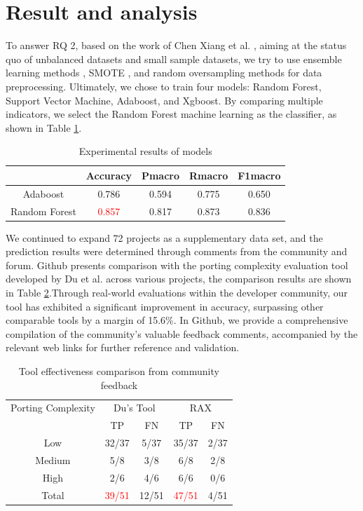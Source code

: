 \documentclass[sigconf,screen,review,anonymous]{acmart}
\begin{document}
\section{Result and analysis}
To answer RQ 2, based on the work of Chen Xiang et al. \cite{5128907}, aiming at the status quo of unbalanced datasets and small sample datasets, we try to use ensemble learning methods \cite{6509481}, SMOTE \cite{4271036}, and random oversampling methods for data preprocessing.
Ultimately, we chose to train four models: Random Forest, Support Vector Machine, Adaboost, and Xgboost.
By comparing multiple indicators, we select the Random Forest machine learning as the classifier, as shown in Table \ref{tab:evaluation}.

\begin{table}
  \caption{Experimental results of models}
  \label{tab:evaluation}
  \begin{tabular}{ccccc}
    \toprule
     & Accuracy & Pmacro & Rmacro & F1macro \\
    \midrule
    Adaboost & 0.786 & 0.594 & 0.775 & 0.650 \\
    Random Forest & \textcolor{red}{0.857} & 0.817 & 0.873 & 0.836 \\
  \bottomrule
\end{tabular}
\end{table}

We continued to expand 72 projects as a supplementary data set, and the prediction results were determined through comments from the community and forum.
Github presents comparison\cite{githubss} with the porting complexity evaluation tool developed by Du et al. across various projects, the comparison results are shown in Table \ref{tab:effectiveness}.Through real-world evaluations within the developer community, our tool has exhibited a significant improvement in accuracy, surpassing other comparable tools by a margin of 15.6\%. In Github, we provide a comprehensive compilation of the community's valuable feedback comments, accompanied by the relevant web links for further reference and validation.

\begin{table}
  \caption{Tool effectiveness comparison from community feedback}
  \label{tab:effectiveness}
  \begin{tabular}{ccccc}
    \toprule
    Porting Complexity & \multicolumn{2}{c}{Du's Tool} & \multicolumn{2}{c}{RAX} \\
     & TP & FN & TP & FN \\
    \midrule
    Low &32/37 & 5/37 & 35/37 & 2/37 \\
    Medium & 5/8 & 3/8 & 6/8 & 2/8 \\
    High & 2/6 & 4/6 & 6/6 & 0/6 \\
    \midrule
    Total & \textcolor{red}{39/51} & 12/51& \textcolor{red}{47/51} & 4/51 \\
      \bottomrule
\end{tabular}
\end{table}
\end{document}
